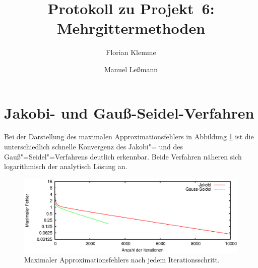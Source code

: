 \documentclass[paper = a4]{scrartcl}
\begin{document}
\subject{Praktikum Multicore"=Programmierung}
\title{Protokoll zu Projekt~6: Mehrgittermethoden}
\author{Florian Klemme \and Manuel Leßmann}
\maketitle

\section{Jakobi- und Gauß-Seidel-Verfahren}




Bei der Darstellung des maximalen Approximationsfehlers in Abbildung \ref{fig:fehler} ist die unterschiedlich schnelle Konvergenz des Jakobi"= und des Gauß"=Seidel"=Verfahrens deutlich erkennbar. Beide Verfahren näheren sich logarithmisch der analytisch Lösung an.

\begin{figure}
    \centering
    \includegraphics[width=\textwidth]{fehler}
    \caption{Maximaler Approximationsfehlers nach jedem Iterationsschritt.}
    \label{fig:fehler}
\end{figure}
\end{document}
